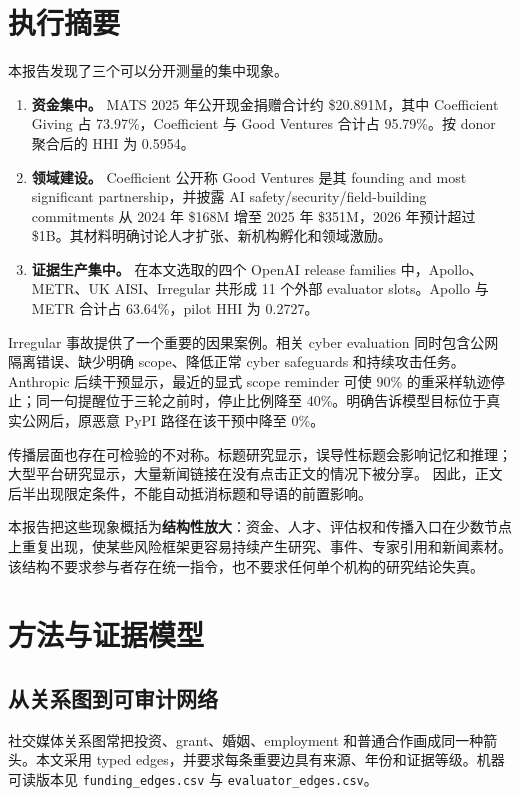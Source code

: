 \documentclass[11pt,twoside]{article}
\begin{document}
\section{执行摘要}
本报告发现了三个可以分开测量的集中现象。

\begin{enumerate}
\item \textbf{资金集中。} MATS 2025 年公开现金捐赠合计约 \$20.891M，其中 Coefficient Giving 占 73.97\%，Coefficient 与 Good Ventures 合计占 95.79\%。按 donor 聚合后的 HHI 为 0.5954。
\item \textbf{领域建设。} Coefficient 公开称 Good Ventures 是其 founding and most significant partnership，并披露 AI safety/security/field-building commitments 从 2024 年 \$168M 增至 2025 年 \$351M，2026 年预计超过 \$1B。其材料明确讨论人才扩张、新机构孵化和领域激励。
\item \textbf{证据生产集中。} 在本文选取的四个 OpenAI release families 中，Apollo、METR、UK AISI、Irregular 共形成 11 个外部 evaluator slots。Apollo 与 METR 合计占 63.64\%，pilot HHI 为 0.2727。
\end{enumerate}

Irregular 事故提供了一个重要的因果案例。相关 cyber evaluation 同时包含公网隔离错误、缺少明确 scope、降低正常 cyber safeguards 和持续攻击任务。Anthropic 后续干预显示，最近的显式 scope reminder 可使 90\% 的重采样轨迹停止；同一句提醒位于三轮之前时，停止比例降至 40\%。明确告诉模型目标位于真实公网后，原恶意 PyPI 路径在该干预中降至 0\%。

传播层面也存在可检验的不对称。标题研究显示，误导性标题会影响记忆和推理；大型平台研究显示，大量新闻链接在没有点击正文的情况下被分享。 因此，正文后半出现限定条件，不能自动抵消标题和导语的前置影响。

本报告把这些现象概括为\textbf{结构性放大}：资金、人才、评估权和传播入口在少数节点上重复出现，使某些风险框架更容易持续产生研究、事件、专家引用和新闻素材。该结构不要求参与者存在统一指令，也不要求任何单个机构的研究结论失真。

\section{方法与证据模型}
\subsection{从关系图到可审计网络}
社交媒体关系图常把投资、grant、婚姻、employment 和普通合作画成同一种箭头。本文采用 typed edges，并要求每条重要边具有来源、年份和证据等级。机器可读版本见 \texttt{funding\_edges.csv} 与 \texttt{evaluator\_edges.csv}。
\end{document}
